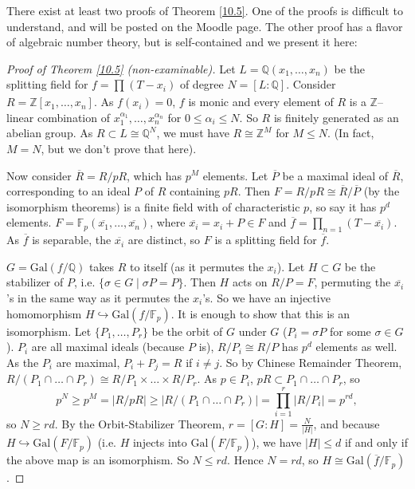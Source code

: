 \documentclass{article}
\theoremstyle{definition}
\begin{document}
There exist at least two proofs of Theorem \ref{10.5}. One of the proofs is difficult to understand, and will be posted on the Moodle page. The other proof has a flavor of algebraic number theory, but is self-contained and we present it here:
\begin{proof}[Proof of Theorem \ref{10.5} (non-examinable)]
    Let $L=\mathbb{Q}(x_1,\ldots,x_n)$ be the splitting field for $f = \prod_{}^{} (T-x_i)$ of degree $N=[L:\mathbb{Q}]$. Consider $R = \mathbb{Z}[x_1,\ldots,x_n]$. As $f(x_i)=0$, $f$ is monic and every element of $R$ is a $\mathbb{Z}$--linear combination of $x_1^{\alpha_1},\ldots,x_n^{\alpha_n}$ for $0\le \alpha_i\le N$. So $R$ is finitely generated as an abelian group. As $R \subset L \cong \mathbb{Q}^N$, we must have $R \cong \mathbb{Z}^M$ for $M\le N$. (In fact, $M=N$, but we don't prove that here).
    \vspace{1mm}

    Now consider $\overline{R}=R/pR$, which has $p^M$ elements. Let $\overline{P}$ be a maximal ideal of $\overline{R}$, corresponding to an ideal $P$ of $R$ containing $pR$. Then $F = R/pR \cong \overline{R}/\overline{P}$ (by the isomorphism theorems) is a finite field with of characteristic $p$, so say it has $p^d$ elements. $F = \mathbb{F}_p(\overline{x_1},\ldots,\overline{x_n})$, where $\overline{x_i}=x_i+P \in F$ and $\overline{f}=\prod_{n=1}^{} (T-\overline{x_i})$. As $\overline{f}$ is separable, the $\overline{x_i}$ are distinct, so $F$ is a splitting field for $\overline{f}$.
    \vspace{1mm}

    $G = \text{Gal}(f/\mathbb{Q})$ takes $R$ to itself (as it permutes the $x_i$). Let $H \subset G$ be the stabilizer of $P$, i.e. $\{\sigma \in G \mid \sigma P = P\}$. Then $H$ acts on $R/P = F$, permuting the $\overline{x_i}$'s in the same way as it permutes the $x_i$'s. So we have an injective homomorphism $H \hookrightarrow \text{Gal}(f/\mathbb{F}_p)$. It is enough to show that this is an isomorphism. Let $\{P_1,\ldots,P_r\}$ be the orbit of $G$ under $G$ ($P_i= \sigma P$ for some $\sigma \in G$). $P_i$ are all maximal ideals (because $P$ is), $R/P_i \cong R/P$ has $p^d$ elements as well. As the $P_i$ are maximal, $P_i+P_j = R$ if $i\neq j$. So by Chinese Remainder Theorem, $R/(P_1 \cap \ldots \cap P_r) \cong R/P_1 \times \ldots \times R/P_r$. As $p \in P_i$, $pR \subset P_1 \cap \ldots \cap P_r$, so \[
    p^N \ge p^M = |R/pR| \ge |R/(P_1 \cap \ldots \cap P_r)| = \prod_{i=1}^{r} |R/P_i| = p^{rd},
    \]
    so $N \ge rd$. By the Orbit-Stabilizer Theorem, $r=[G:H] = \frac{N}{|H|}$, and because $H \hookrightarrow \text{Gal}(F/\mathbb{F}_p)$ (i.e. $H$ injects into $\text{Gal}(F/\mathbb{F}_p)$), we have $|H|\le d$ if and only if the above map is an isomorphism. So $N\le rd$. Hence $N=rd$, so $H \cong \text{Gal}(\overline{f}/\mathbb{F}_p)$.
\end{proof}
\end{document}
